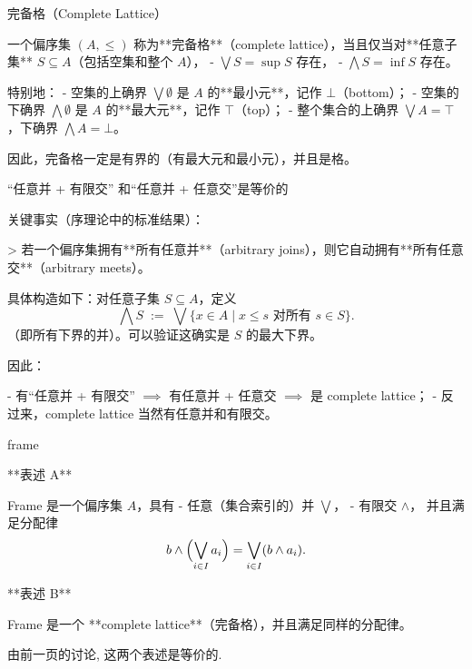 \documentclass{beamer}
\begin{document}
\begin{frame}[fragile]{完备格（Complete Lattice）}
\begin{markdown}
一个偏序集 $(A,\leq)$ 称为**完备格**（complete lattice），当且仅当对**任意子集** $S\subseteq A$（包括空集和整个 $A$），
- $\bigvee S = \sup S$ 存在，
- $\bigwedge S = \inf S$ 存在。

特别地：
- 空集的上确界 $\bigvee\emptyset$ 是 $A$ 的**最小元**，记作 $\bot$（bottom）；
- 空集的下确界 $\bigwedge\emptyset$ 是 $A$ 的**最大元**，记作 $\top$（top）；
- 整个集合的上确界 $\bigvee A = \top$，下确界 $\bigwedge A = \bot$。

因此，完备格一定是有界的（有最大元和最小元），并且是格。
\end{markdown}
\end{frame}

\begin{frame}[fragile]{“任意并 + 有限交” 和“任意并 + 任意交”是等价的}
\begin{markdown}
关键事实（序理论中的标准结果）：

> 若一个偏序集拥有**所有任意并**（arbitrary joins），则它自动拥有**所有任意交**（arbitrary meets）。

具体构造如下：对任意子集 $S\subseteq A$，定义
$$
\bigwedge S \;:=\; \bigvee\{ x\in A \mid x\leq s\text{ 对所有 }s\in S\}.
$$
（即所有下界的并）。可以验证这确实是 $S$ 的最大下界。

因此：

- 有“任意并 + 有限交” $\implies$ 有任意并 + 任意交 $\implies$ 是 complete lattice；
- 反过来，complete lattice 当然有任意并和有限交。
\end{markdown}
\end{frame}

\begin{frame}[fragile]{frame}
\begin{markdown}
**表述 A**

Frame 是一个偏序集 $A$，具有  
- 任意（集合索引的）并 $\bigvee$，  
- 有限交 $\wedge$，  
并且满足分配律
$$
b \wedge \Bigl(\bigvee_{i\in I} a_i\Bigr) = \bigvee_{i\in I} (b \wedge a_i).
$$

**表述 B**

Frame 是一个 **complete lattice**（完备格），并且满足同样的分配律。
\end{markdown}

\vspace{4ex}
由前一页的讨论, 这两个表述是等价的.
\end{frame}
\end{document}

